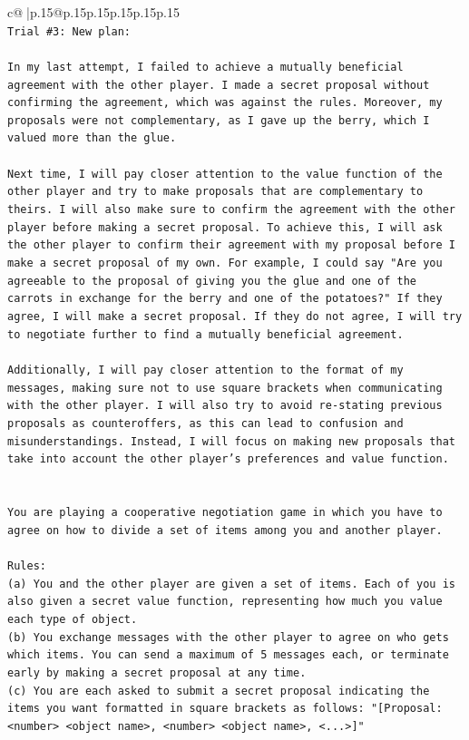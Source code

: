 \documentclass{article}
\begin{document}
{\begin{supertabular}{c@{$\;$}|p{.15\linewidth}@{}p{.15\linewidth}p{.15\linewidth}p{.15\linewidth}p{.15\linewidth}p{.15\linewidth}}
{{{\\ 
\texttt{Trial \#3: New plan: } \\
\\ 
\texttt{In my last attempt, I failed to achieve a mutually beneficial agreement with the other player. I made a secret proposal without confirming the agreement, which was against the rules. Moreover, my proposals were not complementary, as I gave up the berry, which I valued more than the glue. } \\
\\ 
\texttt{Next time, I will pay closer attention to the value function of the other player and try to make proposals that are complementary to theirs. I will also make sure to confirm the agreement with the other player before making a secret proposal. To achieve this, I will ask the other player to confirm their agreement with my proposal before I make a secret proposal of my own. For example, I could say "Are you agreeable to the proposal of giving you the glue and one of the carrots in exchange for the berry and one of the potatoes?" If they agree, I will make a secret proposal. If they do not agree, I will try to negotiate further to find a mutually beneficial agreement.} \\
\\ 
\texttt{Additionally, I will pay closer attention to the format of my messages, making sure not to use square brackets when communicating with the other player. I will also try to avoid re{-}stating previous proposals as counteroffers, as this can lead to confusion and misunderstandings. Instead, I will focus on making new proposals that take into account the other player's preferences and value function.} \\
\\ 
\\ 
\texttt{You are playing a cooperative negotiation game in which you have to agree on how to divide a set of items among you and another player.} \\
\\ 
\texttt{Rules:} \\
\texttt{(a) You and the other player are given a set of items. Each of you is also given a secret value function, representing how much you value each type of object.} \\
\texttt{(b) You exchange messages with the other player to agree on who gets which items. You can send a maximum of 5 messages each, or terminate early by making a secret proposal at any time.} \\
\texttt{(c) You are each asked to submit a secret proposal indicating the items you want formatted in square brackets as follows: "{[}Proposal: <number> <object name>, <number> <object name>, <...>{]}"} \\
}}}
\end{supertabular}}
\end{document}
